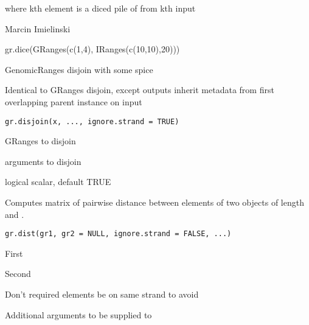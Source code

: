 \documentclass[a4paper]{book}
\begin{document}
%
\begin{Value}
 where kth element is a diced pile of  from kth input 
\end{Value}
%
\begin{Author}\relax
Marcin Imielinski
\end{Author}
%
\begin{Examples}
\begin{ExampleCode}
gr.dice(GRanges(c(1,4), IRanges(c(10,10),20)))
\end{ExampleCode}
\end{Examples}
%
\begin{Description}\relax
GenomicRanges disjoin with some spice

Identical to GRanges disjoin, except outputs inherit metadata from first overlapping parent instance on input
\end{Description}
%
\begin{Usage}
\begin{verbatim}
gr.disjoin(x, ..., ignore.strand = TRUE)
\end{verbatim}
\end{Usage}
%
\begin{Arguments}
\begin{ldescription}
\item[\code{x}] GRanges to disjoin

\item[\code{...}] arguments to disjoin

\item[\code{ignore.strand}] logical scalar, default TRUE
\end{ldescription}
\end{Arguments}
%
\begin{Description}\relax
Computes matrix of pairwise distance between elements of two  objects of length  and .
\end{Description}
%
\begin{Usage}
\begin{verbatim}
gr.dist(gr1, gr2 = NULL, ignore.strand = FALSE, ...)
\end{verbatim}
\end{Usage}
%
\begin{Arguments}
\begin{ldescription}
\item[\code{gr1}] First 

\item[\code{gr2}] Second 

\item[\code{ignore.strand}] Don't required elements be on same strand to avoid 

\item[\code{...}] Additional arguments to be supplied to 
\end{ldescription}
\end{Arguments}
\end{document}
